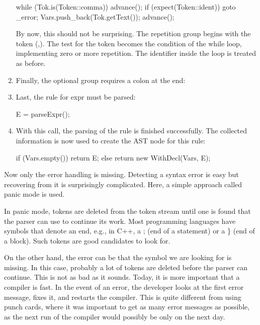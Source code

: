 \begin{enumerate}
\begin{cpp}
    while (Tok.is(Token::comma)) {
        advance();
        if (expect(Token::ident))
            goto _error;
        Vars.push_back(Tok.getText());
        advance();
    }
\end{cpp}

By now, this should not be surprising. The repetition group begins with the token (,). The test for the token becomes the condition of the while loop, implementing zero or more repetition. The identifier inside the loop is treated as before.

\item
Finally, the optional group requires a colon at the end:

\begin{cpp}
    if (consume(Token::colon))
        goto _error;
}
\end{cpp}

\item
Last, the rule for expr must be parsed:

\begin{cpp}
    E = parseExpr();
\end{cpp}

\item
With this call, the parsing of the rule is finished successfully. The collected information is now used to create the AST node for this rule:

\begin{cpp}
    if (Vars.empty()) return E;
    else return new WithDecl(Vars, E);
\end{cpp}
\end{enumerate}

Now only the error handling is missing. Detecting a syntax error is easy but recovering from it is surprisingly complicated. Here, a simple approach called panic mode is used.

In panic mode, tokens are deleted from the token stream until one is found that the parser can use to continue its work. Most programming languages have symbols that denote an end, e.g., in C++, a ; (end of a statement) or a \} (end of a block). Such tokens are good candidates to look for.

On the other hand, the error can be that the symbol we are looking for is missing. In this case, probably a lot of tokens are deleted before the parser can continue. This is not as bad as it sounds. Today, it is more important that a compiler is fast. In the event of an error, the developer looks at the first error message, fixes it, and restarts the compiler. This is quite different from using punch cards, where it was important to get as many error messages as possible, as the next run of the compiler would possibly be only on the next day.

